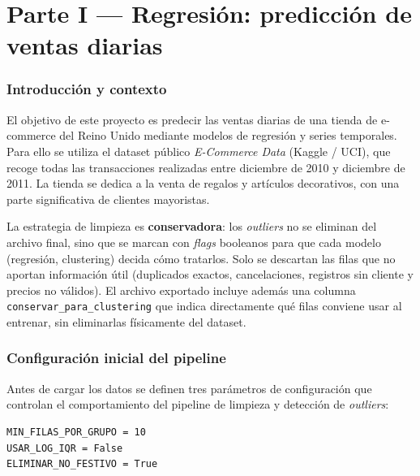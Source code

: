 \documentclass[11pt,a4paper]{article}
\begin{document}
\newpage

\part*{\textcolor{azultfm}{Parte I — Regresión: predicción de ventas diarias}}
\vspace{0.5cm}

\section{Introducción y contexto}

El objetivo de este proyecto es predecir las ventas diarias de una tienda de e-commerce del Reino Unido mediante modelos de regresión y series temporales. Para ello se utiliza el dataset público \textit{E-Commerce Data} (Kaggle / UCI), que recoge todas las transacciones realizadas entre diciembre de 2010 y diciembre de 2011. La tienda se dedica a la venta de regalos y artículos decorativos, con una parte significativa de clientes mayoristas.

La estrategia de limpieza es \textbf{conservadora}: los \textit{outliers} no se eliminan del archivo final, sino que se marcan con \textit{flags} booleanos para que cada modelo (regresión, clustering) decida cómo tratarlos. Solo se descartan las filas que no aportan información útil (duplicados exactos, cancelaciones, registros sin cliente y precios no válidos). El archivo exportado incluye además una columna \texttt{conservar\_para\_clustering} que indica directamente qué filas conviene usar al entrenar, sin eliminarlas físicamente del dataset.

\section{Configuración inicial del pipeline}

Antes de cargar los datos se definen tres parámetros de configuración que controlan el comportamiento del pipeline de limpieza y detección de \textit{outliers}:

\begin{lstlisting}
MIN_FILAS_POR_GRUPO = 10
USAR_LOG_IQR = False
ELIMINAR_NO_FESTIVO = True
\end{lstlisting}
\end{document}
